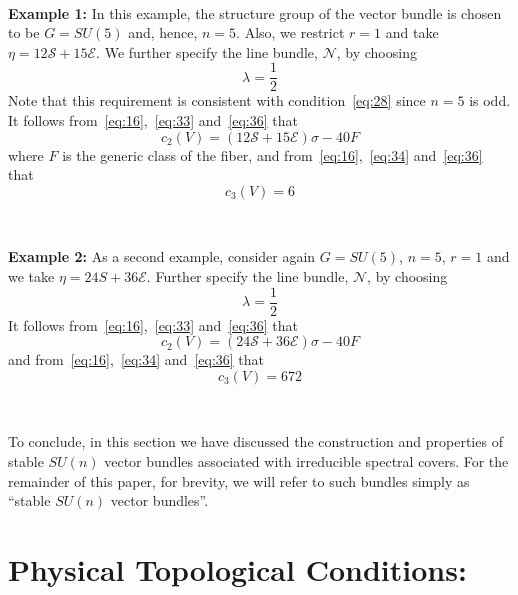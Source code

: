 \documentclass[a4paper,12pt]{article}
\numberwithin{equation}{section}
\def\cE{{\mathcal E}}
\def\cN{{\mathcal N}}
\def\cS{{\mathcal S}}
\theoremstyle{plain}
\begin{document}
\smallskip

\

\noindent
{\bf Example 1:} \quad
In this example, the structure group of the vector bundle is chosen to be
$G=SU(5)$ and, hence, $n=5$. Also, we restrict $r=1$ and take
$\eta=12\cS+15\cE$. 
We further specify the line bundle, $\cN$, by choosing
\begin{equation}
\lambda=\frac{1}{2}
\label{eq:37}
\end{equation}
Note that this requirement 
is consistent with condition~\eqref{eq:28} since $n=5$ is odd.
It follows from~\eqref{eq:16},~\eqref{eq:33} and~\eqref{eq:36} that
\begin{equation}
c_{2}(V)= (12\cS+15\cE)\sigma-40F
\label{eq:38}
\end{equation}
where $F$ is the generic class of the fiber,
and from~\eqref{eq:16},~\eqref{eq:34} and~\eqref{eq:36} that
\begin{equation}
c_{3}(V)= 6
\label{eq:39}
\end{equation}


\smallskip

\

\noindent
{\bf Example 2:} \quad
As a second example, consider
again $G=SU(5)$, $n=5$, $r=1$ and we take $\eta= 24S+36\cE$.
Further specify the line bundle, $\cN$, by choosing
\begin{equation}
\lambda=\frac{1}{2}
\label{eq:40}
\end{equation}
It follows from~\eqref{eq:16},~\eqref{eq:33} and~\eqref{eq:36} that
\begin{equation}
c_{2}(V)= (24\cS+36\cE)\sigma-40F
\label{eq:41}
\end{equation}
and from~\eqref{eq:16},~\eqref{eq:34} and~\eqref{eq:36} that
\begin{equation}
c_{3}(V)= 672
\label{eq:42}
\end{equation}

\smallskip

\

To conclude, in this section we have discussed the construction and properties
of stable $SU(n)$ vector bundles associated with irreducible spectral covers.
For the remainder of this paper, for brevity, we will refer to such bundles
simply as ``stable $SU(n)$ vector bundles''.


\section{Physical Topological Conditions:}
\end{document}
